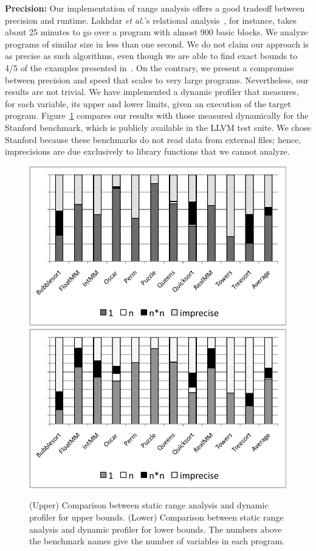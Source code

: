 \documentclass{sigplanconf}[10pt]
\begin{document}
\noindent
\textbf{Precision: }
Our implementation of range analysis offers a good tradeoff between
precision and runtime.
Lakhdar {\em et al.}'s relational analysis~\cite{Lakhdar11}, for instance,
takes about 25 minutes to go over a program with almost 900 basic blocks.
We analyze programs of similar size in less than one second.
We do not claim our approach is as precise as such algorithms, even though we
are able to find exact bounds to 4/5 of the examples presented
in~\cite{Lakhdar11}.
On the contrary, we present a compromise between precision and speed
that scales to very large programs.
Nevertheless, our results are not trivial.
We have implemented a dynamic profiler that measures, for each variable,
its upper and lower limits, given an execution of the target program.
Figure~\ref{fig:precision} compares our results with those measured
dynamically for the Stanford benchmark, which is publicly
available in the LLVM test suite.
We chose Stanford because these benchmarks do not read data from external
files; hence, imprecisions are due exclusively to library functions that we cannot
analyze.

\begin{figure}[t!]
\begin{center}
\includegraphics[width=\columnwidth]{images/precUpperBound}
\includegraphics[width=\columnwidth]{images/precLowerBound}
\end{center}
\caption{\label{fig:precision}
(Upper) Comparison between static range analysis and dynamic profiler for
upper bounds.
(Lower) Comparison between static range analysis and dynamic profiler for
lower bounds. The numbers above the benchmark names give the number of
variables in each program.}
\end{figure}
\end{document}
